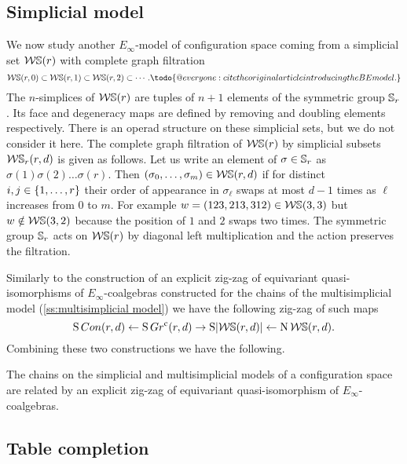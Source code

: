 \subsection{Simplicial model} \label{ss:simplicial model}

We now study another $E_\infty$-model of configuration space coming from a simplicial set $\mathcal{W}\mathbb{S}(r)$ with complete graph filtration
\[
\cW\sym(r,0) \subset \cW\sym(r,1) \subset \cW\sym(r,2) \subset \dotsb . \todo{@everyone: cite the original article introducing the BE model.}
\]
The $n$-simplices of $\mathcal{W}\mathbb{S}(r)$ are tuples of $n+1$ elements of the symmetric group $\mathbb{S}_r$.
Its face and degeneracy maps are defined by removing and doubling elements respectively.
There is an operad structure on these simplicial sets, but we do not consider it here.
The complete graph filtration of $\mathcal{W}\mathbb{S}(r)$ by simplicial subsets $\mathcal{W}\mathbb{S}_r(r,d)$ is given as follows.
Let us write an element of $\sigma \in \mathbb{S}_r$ as $\sigma(1) \sigma(2) \dots \sigma(r)$.
Then $(\sigma_0,\dots,\sigma_m) \in \mathcal{W}\mathbb{S}(r,d)$ if for distinct $i,j \in \{1,\dots,r\}$ their order of appearance in $\sigma_\ell$ swaps at most $d-1$ times as $\ell$ increases from $0$ to $m$.
For example $w = (123,213,312) \in \mathcal{W}\mathbb{S}(3,3)$ but $w \notin \mathcal{W}\mathbb{S}(3,2)$ because the position of $1$ and $2$ swaps two times.
The symmetric group $\mathbb{S}_r$ acts on $\mathcal{W}\mathbb{S}(r)$ by diagonal left multiplication and the action preserves the filtration.

Similarly to the construction of an explicit zig-zag of equivariant quasi-isomorphisms of $E_\infty$-coalgebras constructed for the chains of the multisimplicial model (\cref{ss:multisimplicial model}) we have the following zig-zag of such maps
\[
\operatorname{S}Con(r,d) \leftarrow \operatorname{S} Gr^{\mathrm{c}}(r,d) \to \operatorname{S}\lvert\mathcal{W}\mathbb{S}(r,d)\rvert \leftarrow \operatorname{N} \mathcal{W}\mathbb{S}(r,d).
\]
Combining these two constructions we have the following.
\begin{theorem*}
	The chains on the simplicial and multisimplicial models of a configuration space are related by an explicit zig-zag of equivariant quasi-isomorphism of $E_\infty$-coalgebras.
\end{theorem*}

\subsection{Table completion}

